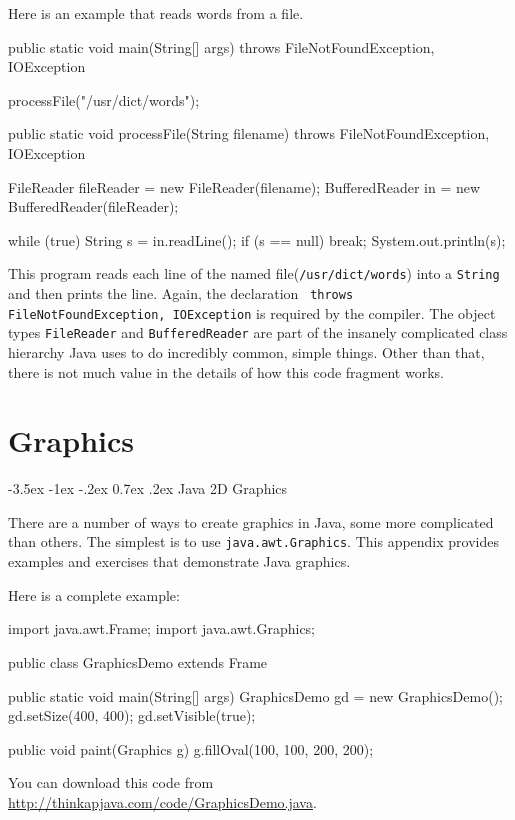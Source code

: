 \documentclass{book}
\makeatletter
\newcounter{exercisenum}
\renewcommand{\section}{\@startsection 
    {section} {1} {0mm}%
    {-3.5ex \@plus -1ex \@minus -.2ex}%
    {0.7ex \@plus.2ex}%
    {\normalfont\Large\bfseries}}
\newcommand{\clearemptydoublepage}{\newpage{\pagestyle{empty}\cleardoublepage}}
\newcommand{\beforechapter}{
    \cleardoublepage 
    \setcounter{exercisenum}{0}
}
\makeatother
\begin{document}
Here is an example that reads words from a file.

\begin{verbatimtab}
    public static void main(String[] args)
        throws FileNotFoundException, IOException {
	
        processFile("/usr/dict/words");
    }

    public static void processFile(String filename)
        throws FileNotFoundException, IOException {

        FileReader fileReader = new FileReader(filename);
        BufferedReader in = new BufferedReader(fileReader);

        while (true) {
            String s = in.readLine();
            if (s == null) break;
            System.out.println(s);
        }
    }
\end{verbatimtab}

This program reads each line of the named file({\tt /usr/dict/words})
into a {\tt String} and then prints the line.  Again, the declaration {\tt
throws FileNotFoundException, IOException} is required by the
compiler.  The object types {\tt FileReader} and {\tt BufferedReader}
are part of the insanely complicated class hierarchy Java uses to do
incredibly common, simple things.  Other than that, there is not
much value in the details of how this code fragment works.


\beforechapter
\chapter{Graphics}
\label{graphics}

\section{Java 2D Graphics}

There are a number of ways to create graphics in Java, some more
complicated than others.  The simplest is to use {\tt java.awt.Graphics}.
This appendix provides examples and exercises that demonstrate
Java graphics.

Here is a complete example:

\begin{verbatimtab}
import java.awt.Frame;
import java.awt.Graphics;

public class GraphicsDemo extends Frame {

    public static void main(String[] args) {
	GraphicsDemo gd = new GraphicsDemo();
	gd.setSize(400, 400);
	gd.setVisible(true);
    }

    public void paint(Graphics g) {
	g.fillOval(100, 100, 200, 200);
    }
}
\end{verbatimtab}
%
You can download this code from
\url{http://thinkapjava.com/code/GraphicsDemo.java}.
\end{document}
